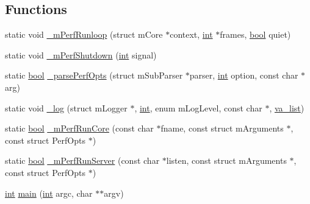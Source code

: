 \subsection*{Functions}
\begin{DoxyCompactItemize}
\item 
static void \mbox{\hyperlink{perf-main_8c_af6104bb4f19919428b0781d4c2e09e1d}{\+\_\+m\+Perf\+Runloop}} (struct m\+Core $\ast$context, \mbox{\hyperlink{ioapi_8h_a787fa3cf048117ba7123753c1e74fcd6}{int}} $\ast$frames, \mbox{\hyperlink{libretro_8h_a4a26dcae73fb7e1528214a068aca317e}{bool}} quiet)
\item 
static void \mbox{\hyperlink{perf-main_8c_ae03bb46043d38ba7457625ec193d25c9}{\+\_\+m\+Perf\+Shutdown}} (\mbox{\hyperlink{ioapi_8h_a787fa3cf048117ba7123753c1e74fcd6}{int}} signal)
\item 
static \mbox{\hyperlink{libretro_8h_a4a26dcae73fb7e1528214a068aca317e}{bool}} \mbox{\hyperlink{perf-main_8c_a95bd03ff14c9138daf9f88703ab5d5f7}{\+\_\+parse\+Perf\+Opts}} (struct m\+Sub\+Parser $\ast$parser, \mbox{\hyperlink{ioapi_8h_a787fa3cf048117ba7123753c1e74fcd6}{int}} option, const char $\ast$arg)
\item 
static void \mbox{\hyperlink{perf-main_8c_ab638d8a3b5157696f6a07239141bcd51}{\+\_\+log}} (struct m\+Logger $\ast$, \mbox{\hyperlink{ioapi_8h_a787fa3cf048117ba7123753c1e74fcd6}{int}}, enum m\+Log\+Level, const char $\ast$, \mbox{\hyperlink{__builder_8h_a2b7adf9b9fd4a58a693dc7cfba5b9006}{va\+\_\+list}})
\item 
static \mbox{\hyperlink{libretro_8h_a4a26dcae73fb7e1528214a068aca317e}{bool}} \mbox{\hyperlink{perf-main_8c_aa853b44038d99a0c66c0961c5c1b0d66}{\+\_\+m\+Perf\+Run\+Core}} (const char $\ast$fname, const struct m\+Arguments $\ast$, const struct Perf\+Opts $\ast$)
\item 
static \mbox{\hyperlink{libretro_8h_a4a26dcae73fb7e1528214a068aca317e}{bool}} \mbox{\hyperlink{perf-main_8c_afabe448ade5b82039d7a47c954faff33}{\+\_\+m\+Perf\+Run\+Server}} (const char $\ast$listen, const struct m\+Arguments $\ast$, const struct Perf\+Opts $\ast$)
\item 
\mbox{\hyperlink{ioapi_8h_a787fa3cf048117ba7123753c1e74fcd6}{int}} \mbox{\hyperlink{perf-main_8c_a3c04138a5bfe5d72780bb7e82a18e627}{main}} (\mbox{\hyperlink{ioapi_8h_a787fa3cf048117ba7123753c1e74fcd6}{int}} argc, char $\ast$$\ast$argv)
\end{DoxyCompactItemize}
